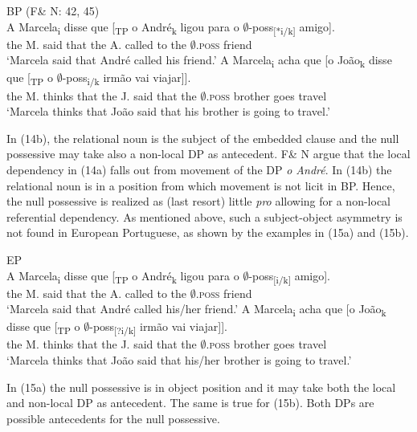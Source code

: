 \documentclass[output=paper]{langsci/langscibook}
\begin{document}
\ea%
    BP (F\& N: 42, 45)\label{ex:wein:14}\\
    \ea
    \gll A Marcela\textsubscript{i} disse que [\textsubscript{TP} o André\textsubscript{k} ligou para o $\emptyset$-poss\textsubscript{[}\textsubscript{*i/k]} amigo].\\
         the M. said that the A. called to the $\emptyset$\textsc{.poss} friend\\
    \glt ‘Marcela said that André called his friend.’
    \ex  
    \gll A Marcela\textsubscript{i} acha que [o João\textsubscript{k} disse que [\textsubscript{TP} o $\emptyset$-poss\textsubscript{i/k} irmão vai viajar]].\\
         the M. thinks that the J. said that the $\emptyset$\textsc{.poss} brother goes travel\\
    \glt ‘Marcela thinks that João said that his brother is going to travel.’
    \z
\z

In (14b), the relational noun is the subject of the embedded clause and the null possessive may take also a non-local DP as antecedent. F\& N argue that the local dependency in (14a) falls out from movement of the DP \textit{o André}. In (14b) the relational noun is in a position from which movement is not licit in BP. Hence, the null possessive is realized as (last resort) little \textit{pro} allowing for a non-local referential dependency. As mentioned above, such a subject-object asymmetry is not found in European Portuguese, as shown by the examples in (15a) and (15b).

\ea%
    EP\label{ex:wein:15}\\
    \ea
    \gll A Marcela\textsubscript{i} disse que [\textsubscript{TP} o André\textsubscript{k} ligou para o $\emptyset$-poss\textsubscript{[}\textsubscript{i/k]} amigo].\\
         the M. said that the A. called to the $\emptyset$\textsc{.poss} friend\\
    \glt ‘Marcela said that André called his/her friend.’
    \ex  
    \gll A Marcela\textsubscript{i} acha que [o João\textsubscript{k} disse que [\textsubscript{TP} o $\emptyset$-poss\textsubscript{[}\textsubscript{?i/k]} irmão vai viajar]].\\
         the M. thinks that the J. said that the $\emptyset$\textsc{.poss} brother goes travel\\
    \glt ‘Marcela thinks that João said that his/her brother is going to travel.’
    \z
\z

In (15a) the null possessive is in object position and it may take both the local and non-local DP as antecedent. The same is true for (15b). Both DPs are possible antecedents for the null possessive.
\end{document}
